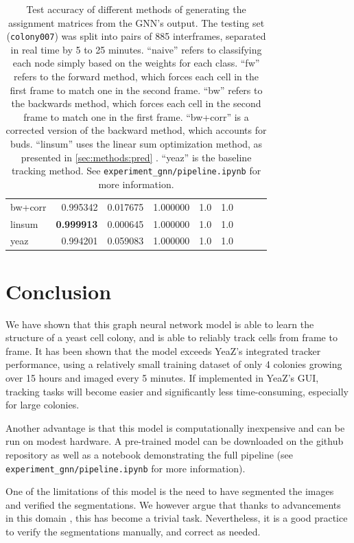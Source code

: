 \documentclass[10pt,conference,compsocconf,a4paper]{IEEEtran}
\newcommand*{\shortautoref}[1]{%
	\begingroup
	\def\equationautorefname{\textsc{Eq.}}%
	\def\tableautorefname{\textsc{Tab.}}%
	\def\figureautorefname{\textsc{Fig.}}%
	\autoref{#1}%
	\endgroup
}
\begin{document}
\begin{table}
\begin{tabular}{lrrrrrrrr}
			bw+corr       &  0.995342 &  0.017675 &  1.000000 &  1.0 &  1.0 \\
			linsum        &  \textbf{0.999913} &  0.000645 &  1.000000 &  1.0 &  1.0 \\
			\midrule
			yeaz          &  0.994201 &  0.059083 &  1.000000 &  1.0 &  1.0 \\
			\bottomrule
			\end{tabular}
			\caption{Test accuracy of different methods of generating the assignment matrices from the GNN's output. The testing set (\texttt{colony007}) was split into pairs of 885 interframes, separated in real time by 5 to 25 minutes. ``naive'' refers to classifying each node simply based on the weights for each class. ``fw'' refers to the forward method, which forces each cell in the first frame to match one in the second frame. ``bw'' refers to the backwards method, which forces each cell in the second frame to match one in the first frame. ``bw+corr'' is a corrected version of the backward method, which accounts for buds. ``linsum'' uses the linear sum optimization method, as presented in \shortautoref{sec:methods:pred}. ``yeaz'' is the baseline tracking method. See \texttt{experiment\_gnn/pipeline.ipynb} for more information.}
			\label{tab:test_acc}
		\end{table}


\section{Conclusion}

	We have shown that this graph neural network model is able to learn the structure of a yeast cell colony, and is able to reliably track cells from frame to frame. It has been shown that the model exceeds YeaZ's integrated tracker performance, using a relatively small training dataset of only 4 colonies growing over 15 hours and imaged every 5 minutes. If implemented in YeaZ's GUI, tracking tasks will become easier and significantly less time-consuming, especially for large colonies.
	
	Another advantage is that this model is computationally inexpensive and can be run on modest hardware. A pre-trained model can be downloaded on the github repository \cite{vadot_cs-433_2021} as well as a notebook demonstrating the full pipeline (see \texttt{experiment\_gnn/pipeline.ipynb} for more information).

	One of the limitations of this model is the need to have segmented the images and verified the segmentations. We however argue that thanks to advancements in this domain \cite{dietler_convolutional_2020,stringer_cellpose_2020}, this has become a trivial task. Nevertheless, it is a good practice to verify the segmentations manually, and correct as needed.
\end{document}
